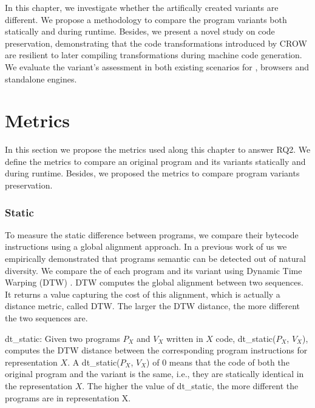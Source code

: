 

\newcommand{\DTWStatic}{dt\_static\xspace}

In this chapter, we investigate whether the artifically created variants are different. We propose a methodology to compare the program variants both statically and during runtime. Besides, we present a novel study on code preservation, demonstrating that the code transformations introduced by CROW are resilient to later compiling transformations during machine code generation. We evaluate the variant's assessment in both existing scenarios for \wasm, browsers and standalone engines.

\section{Metrics}

In this section we propose the metrics used along this chapter to answer RQ2. We define the metrics to compare an original program and its variants statically and during runtime. Besides, we proposed the metrics to compare program variants preservation.

\subsubsection{Static}

To measure the static difference between programs, we compare their bytecode instructions using a global alignment approach. In a previous work of us \cite{} we empirically demonstrated that programs semantic can be detected out of natural diversity. We compare the \wasm of each program and its variant using Dynamic Time Warping (DTW) \cite{Maia08usinga}. DTW computes the global alignment between two sequences. It returns a value capturing the cost of this alignment, which is actually a distance metric, called DTW. The larger the DTW distance, the more different the two sequences are.

\begin{metric}{dt\_static:}\label{metric:static1}
	Given two programs $P_X$ and $V_X$ written in $X$ code, dt\_static($P_X$, $V_X$), computes the DTW distance between the corresponding program instructions for representation $X$. A dt\_static($P_X$, $V_X$) of $0$ means that the code of both the original program and the variant  is the same, i.e., they are statically identical in the representation $X$. The higher the value of dt\_static, the more different the programs are in representation X. \\
\end{metric}
	


